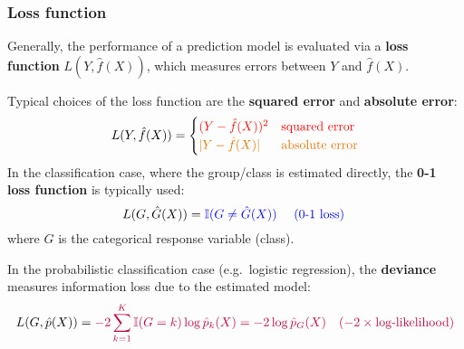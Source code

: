 \documentclass[smaller]{beamer}
\newcommand{\?}{\stackrel{?}{=}}
\newcommand{\rd}{\color{red}}
\newcommand{\bl}{\color{blue}}
\newcommand{\pl}{\color{purple}}
\newcommand{\og}{\color{orange!90!black}}
\begin{document}
\begin{frame}
  \frametitle{Loss function}
  \pause

  Generally, the performance of a prediction model is evaluated via a \textbf{loss function} $L(Y,\hat f(X))$, which measures errors between $Y$ and $\hat f(X)$.\\\pause

  \bigskip

  Typical choices of the loss function are the \textbf{\rd squared error} and \textbf{\og absolute error}:
  \pause
  \begin{equation}
    \label{eq:10}
    L(Y,\hat f(X)) =
    \begin{cases}
      \rd (Y - \hat f(X))^2 & \text{\rd squared error} \\
      \og |Y - \hat f(X)|   & \text{\og absolute error}
    \end{cases}
  \end{equation}
  \pause
  In the classification case, where the group/class is estimated directly, the \textbf{\bl 0-1 loss function} is typically used:\pause
  \begin{equation}
    \label{eq:10b}
    L(G,\hat G(X)) = {\bl \mathbb{I}(G \ne \hat G(X)) \quad \text{ (0-1 loss) } }
  \end{equation}
  \pause
  where $G$ is the categorical response variable (class). \\ \pause

  In the probabilistic classification case (e.g.\ logistic regression), the \textbf{\pl deviance} measures information loss due to the estimated model:\pause
  \begin{equation}
    \label{eq:10c}
        L(G,\hat p(X)) = {\pl - 2\sum_{k=1}^K  \mathbb{I}(G = k) \log \hat p_k (X) = -2\log\hat p_G(X) \quad (-2\times\text{log-likelihood}) }
  \end{equation}
\end{frame}
\end{document}
